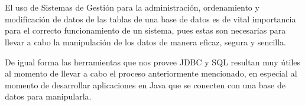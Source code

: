 \documentclass[10pt,a4paper]{article} %
\begin{document}
	\pagebreak
	
	
	\section{}
	{\large El uso de Sistemas de Gesti{\' o}n para la administraci{\' o}n, ordenamiento y modificaci{\' o}n de datos de las tablas de una base de datos es de vital importancia para el correcto funcionamiento de un sistema, pues estas son necesarias para llevar a cabo la manipulaci{\' o}n de los datos de manera eficaz, segura y sencilla. 
		
		
		\vspace{0.5cm}
		De igual forma las herramientas que nos provee JDBC y SQL resultan muy {\' u}tiles al momento de llevar a cabo el proceso anteriormente mencionado, en especial al momento de desarrollar aplicaciones en Java que se conecten con una base de datos para manipularla.}
	
	
	\pagebreak
	
	
	\section{}
	
\end{document}
